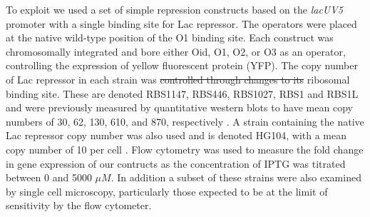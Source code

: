 \pagebreak



To exploit \eref[eq7] we used a set of simple repression constructs based on the
\textit{lacUV5} promoter with a single binding site for Lac repressor. The
operators were placed at the native wild-type position of the O1 binding site.
Each construct was chromosomally integrated and bore either Oid, O1, O2, or O3
as an operator, controlling the expression of yellow fluorescent protein (YFP).
The copy number of Lac repressor in each strain was  \sout{controlled through changes
to its} ribosomal binding site. These are denoted RBS1147, RBS446, RBS1027, RBS1
and RBS1L  and were previously measured by quantitative western blots to have
mean copy numbers of 30, 62, 130, 610, and 870, respectively \cite{Garcia2011}.
A strain containing the native Lac repressor copy number was also used and is
denoted HG104, with a mean copy number of 10 per cell . Flow cytometry was used
to measure the fold change in gene expression of our contructs as the
concentration of IPTG was titrated between 0 and 5000 $\mu M$. In addition a
subset of these strains were also examined by single cell microscopy,
particularly those expected to be at the limit of sensitivity by the flow
cytometer. 

